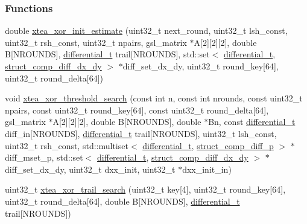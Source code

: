 \subsubsection*{\-Functions}
\begin{DoxyCompactItemize}
\item 
double \hyperlink{xtea-xor-threshold-search_8cc_a91f5b9d37a2c3701676d92f8402a2d8d}{xtea\-\_\-xor\-\_\-init\-\_\-estimate} (uint32\-\_\-t next\-\_\-round, uint32\-\_\-t lsh\-\_\-const, uint32\-\_\-t rsh\-\_\-const, uint32\-\_\-t npairs, gsl\-\_\-matrix $\ast$\-A\mbox{[}2\mbox{]}\mbox{[}2\mbox{]}\mbox{[}2\mbox{]}, double \-B\mbox{[}\-N\-R\-O\-U\-N\-D\-S\mbox{]}, \hyperlink{structdifferential__t}{differential\-\_\-t} trail\mbox{[}\-N\-R\-O\-U\-N\-D\-S\mbox{]}, std\-::set$<$ \hyperlink{structdifferential__t}{differential\-\_\-t}, \hyperlink{structstruct__comp__diff__dx__dy}{struct\-\_\-comp\-\_\-diff\-\_\-dx\-\_\-dy} $>$ $\ast$diff\-\_\-set\-\_\-dx\-\_\-dy, uint32\-\_\-t round\-\_\-key\mbox{[}64\mbox{]}, uint32\-\_\-t round\-\_\-delta\mbox{[}64\mbox{]})
\item 
void \hyperlink{xtea-xor-threshold-search_8cc_a04cc0c55d61b755d6b9435e301420f0f}{xtea\-\_\-xor\-\_\-threshold\-\_\-search} (const int n, const int nrounds, const uint32\-\_\-t npairs, const uint32\-\_\-t round\-\_\-key\mbox{[}64\mbox{]}, const uint32\-\_\-t round\-\_\-delta\mbox{[}64\mbox{]}, gsl\-\_\-matrix $\ast$\-A\mbox{[}2\mbox{]}\mbox{[}2\mbox{]}\mbox{[}2\mbox{]}, double \-B\mbox{[}\-N\-R\-O\-U\-N\-D\-S\mbox{]}, double $\ast$\-Bn, const \hyperlink{structdifferential__t}{differential\-\_\-t} diff\-\_\-in\mbox{[}\-N\-R\-O\-U\-N\-D\-S\mbox{]}, \hyperlink{structdifferential__t}{differential\-\_\-t} trail\mbox{[}\-N\-R\-O\-U\-N\-D\-S\mbox{]}, uint32\-\_\-t lsh\-\_\-const, uint32\-\_\-t rsh\-\_\-const, std\-::multiset$<$ \hyperlink{structdifferential__t}{differential\-\_\-t}, \hyperlink{structstruct__comp__diff__p}{struct\-\_\-comp\-\_\-diff\-\_\-p} $>$ $\ast$diff\-\_\-mset\-\_\-p, std\-::set$<$ \hyperlink{structdifferential__t}{differential\-\_\-t}, \hyperlink{structstruct__comp__diff__dx__dy}{struct\-\_\-comp\-\_\-diff\-\_\-dx\-\_\-dy} $>$ $\ast$diff\-\_\-set\-\_\-dx\-\_\-dy, uint32\-\_\-t dxx\-\_\-init, uint32\-\_\-t $\ast$dxx\-\_\-init\-\_\-in)
\item 
uint32\-\_\-t \hyperlink{xtea-xor-threshold-search_8cc_a755f7a2a412e54249912f5d79dd089d0}{xtea\-\_\-xor\-\_\-trail\-\_\-search} (uint32\-\_\-t key\mbox{[}4\mbox{]}, uint32\-\_\-t round\-\_\-key\mbox{[}64\mbox{]}, uint32\-\_\-t round\-\_\-delta\mbox{[}64\mbox{]}, double \-B\mbox{[}\-N\-R\-O\-U\-N\-D\-S\mbox{]}, \hyperlink{structdifferential__t}{differential\-\_\-t} trail\mbox{[}\-N\-R\-O\-U\-N\-D\-S\mbox{]})

\end{DoxyCompactItemize}
